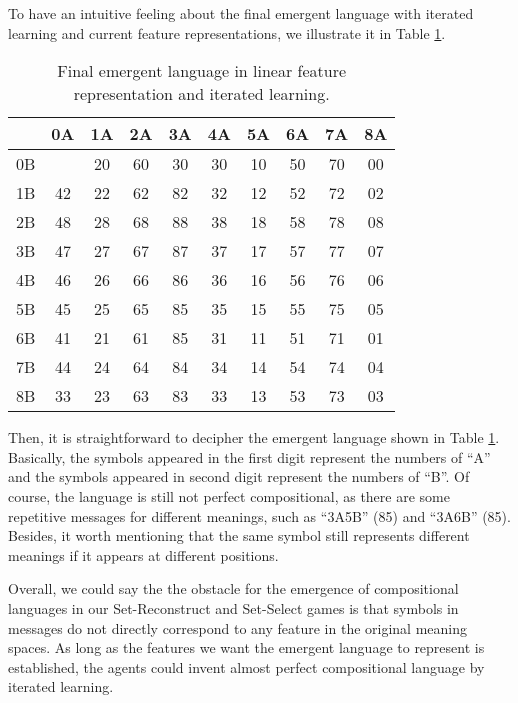 To have an intuitive feeling about the final emergent language with iterated learning and current feature representations, we illustrate it in Table \ref{tab4.6:emregent_language_referential_perfect}. 

\begin{table}[!h]
    \centering
    \begin{tabular}{|c|c|c|c|c|c|c|c|c|c|}
        \hline
           & 0A & 1A & 2A & 3A & 4A & 5A & 6A & 7A & 8A \\ \hline
        0B &    & 20 & 60 & 30 & 30 & 10 & 50 & 70 & 00 \\ \hline
        1B & 42 & 22 & 62 & 82 & 32 & 12 & 52 & 72 & 02 \\ \hline
        2B & 48 & 28 & 68 & 88 & 38 & 18 & 58 & 78 & 08 \\ \hline
        3B & 47 & 27 & 67 & 87 & 37 & 17 & 57 & 77 & 07 \\ \hline
        4B & 46 & 26 & 66 & 86 & 36 & 16 & 56 & 76 & 06 \\ \hline
        5B & 45 & 25 & 65 & 85 & 35 & 15 & 55 & 75 & 05 \\ \hline
        6B & 41 & 21 & 61 & 85 & 31 & 11 & 51 & 71 & 01 \\ \hline
        7B & 44 & 24 & 64 & 84 & 34 & 14 & 54 & 74 & 04 \\ \hline
        8B & 33 & 23 & 63 & 83 & 33 & 13 & 53 & 73 & 03 \\ \hline
        \end{tabular}
    \caption{Final emergent language in linear feature representation and iterated learning.}
    \label{tab4.6:emregent_language_referential_perfect}
\end{table}

Then, it is straightforward to decipher the emergent language shown in Table \ref{tab4.6:emregent_language_referential_perfect}. Basically, the symbols appeared in the first digit represent the numbers of ``A'' and the symbols appeared in second digit represent the numbers of ``B''. Of course, the language is still not perfect compositional, as there are some repetitive messages for different meanings, such as ``3A5B'' (85) and ``3A6B'' (85). Besides, it worth mentioning that the same symbol still represents different meanings if it appears at different positions.

Overall, we could say the the obstacle for the emergence of compositional languages in our Set-Reconstruct and Set-Select games is that symbols in messages do not directly correspond to any feature in the original meaning spaces. As long as the features we want the emergent language to represent is established, the agents could invent almost perfect compositional language by iterated learning.

